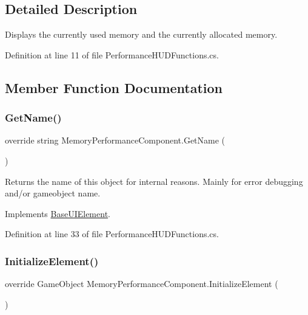 \subsection{Detailed Description}
Displays the currently used memory and the currently allocated memory. 



Definition at line 11 of file Performance\+H\+U\+D\+Functions.\+cs.



\subsection{Member Function Documentation}
\mbox{\label{class_memory_performance_component_a39185828d1f3fba8f1d10f56e11ac198}} 
\subsubsection{\texorpdfstring{Get\+Name()}{GetName()}}
{\footnotesize\ttfamily override string Memory\+Performance\+Component.\+Get\+Name (\begin{DoxyParamCaption}{ }\end{DoxyParamCaption})\hspace{0.3cm}{\ttfamily [virtual]}}



Returns the name of this object for internal reasons. Mainly for error debugging and/or gameobject name. 



Implements \hyperlink{class_base_u_i_element_acb7fcd49138477941f2e43733ad9d34d}{Base\+U\+I\+Element}.



Definition at line 33 of file Performance\+H\+U\+D\+Functions.\+cs.

\mbox{\label{class_memory_performance_component_a8bc4c195f47ee32b0166c30d015d3db5}} 
\subsubsection{\texorpdfstring{Initialize\+Element()}{InitializeElement()}}
{\footnotesize\ttfamily override Game\+Object Memory\+Performance\+Component.\+Initialize\+Element (\begin{DoxyParamCaption}{ }\end{DoxyParamCaption})\hspace{0.3cm}{\ttfamily [virtual]}}



